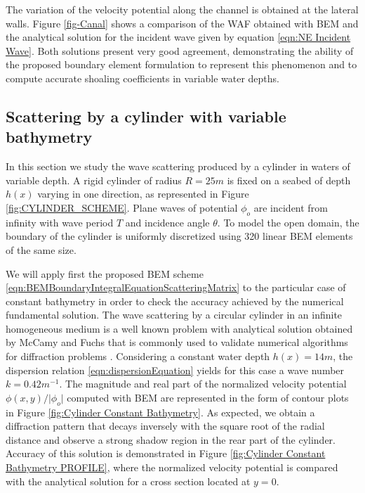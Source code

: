 The variation of the velocity potential along the channel is obtained at the lateral walls. Figure \ref{fig-Canal} shows a comparison of the WAF obtained with BEM and the analytical solution for the incident wave given by equation \eqref{eqn:NE Incident Wave}. Both solutions present very good agreement, demonstrating the ability of the proposed boundary element formulation to represent this phenomenon and to compute accurate shoaling coefficients in variable water depths.

\subsection{Scattering by a cylinder with variable bathymetry}
\label{SUBSECTION: NE CYLINDER CONSTANT BATHYMETY}
In this section we study the wave scattering produced by a cylinder in waters of variable depth. A rigid cylinder of radius $R=25 m$ is fixed on a seabed of depth $h(x)$ varying in one direction, as represented in Figure \ref{fig:CYLINDER_SCHEME}. Plane waves of potential $\phi_{o}$ are incident from infinity with wave period $T$ and incidence angle $\theta$. To model the open domain, the boundary of the cylinder is uniformly discretized using 320 linear BEM elements of the same size.

We will apply first the proposed BEM scheme \eqref{eqn:BEMBoundaryIntegralEquationScatteringMatrix} to the particular case of constant bathymetry in order to check the accuracy achieved by the numerical fundamental solution. The wave scattering by a circular cylinder in an infinite homogeneous medium is a well known problem with analytical solution obtained by McCamy and Fuchs \cite{MacCamy1954} that is commonly used to validate numerical algorithms for diffraction problems \cite{Berkhoff1976,Mei1983}. Considering a constant water depth $h(x)=14 m$, the dispersion relation \eqref{eqn:dispersionEquation} yields for this case a wave number $k=0.42 m^{-1}$. The magnitude and real part of the normalized velocity potential $\phi(x,y)/\vert\phi_{o}\vert$ computed with BEM are represented in the form of contour plots in Figure \ref{fig:Cylinder Constant Bathymetry}. As expected, we obtain a diffraction pattern that decays inversely with the square root of the radial distance and observe a strong shadow region in the rear part of the cylinder. Accuracy of this solution is demonstrated in Figure \ref{fig:Cylinder Constant Bathymetry PROFILE}, where the normalized velocity potential is compared with the analytical solution for a cross section located at $y=0$.

